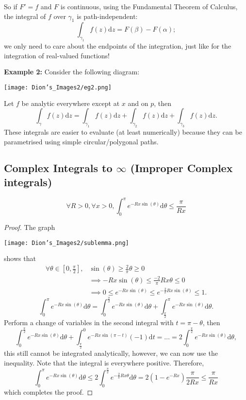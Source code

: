 So if $F' = f$ and $F$ is continuous, using the Fundamental Theorem of Calculus, the integral of $f$ over $\gamma_1$ is path-independent:
$$\int_{\gamma_1}f(z) \mathrm{d}z = F(\beta) - F(\alpha);$$
we only need to care about the endpoints of the integration, just like for the integration of real-valued functions!

\medskip\textbf{Example 2:} Consider the following diagram:

\centerline{\texttt{[image: Dion's\_Images2/eg2.png]}}

Let $f$ be analytic everywhere except at $x$ and on $p$, then
$$\int_\gamma f(z) \mathrm{d}z = \int_{\gamma_1} f(z) \mathrm{d}z + \int_{\gamma_2} f(z) \mathrm{d}z + \int_{\gamma_3} f(z) \mathrm{d}z.$$
These integrals are easier to evaluate (at least numerically) because they can be parametrised using simple circular/polygonal paths.

\subsection{Complex Integrals to $\infty$ (Improper Complex integrals)}

\begin{lem}
$$\forall R > 0, \forall x > 0, \int_0^\pi e^{-Rx\sin(\theta)} \mathrm{d}\theta \leq \frac{\pi}{Rx}$$
\end{lem}

\begin{proof}
The graph

\centerline{\texttt{[image: Dion's\_Images2/sublemma.png]}}

shows that 
\begin{align*}
\forall \theta \in \left[0, \frac{\pi}{2}\right], &\sin(\theta) \geq \frac{2}{\pi}\theta \geq 0 \\
&\implies -Rx\sin(\theta) \leq \frac{-2}{\pi}Rx\theta \leq 0 \\
&\implies 0 \leq e^{-Rx\sin(\theta)} \leq e^{-\frac{2}{\pi}Rx\sin(\theta)} \leq 1.
\end{align*}
$$\int_0^\pi e^{-Rx\sin(\theta)} \mathrm{d}\theta = \int_0^{\frac{\pi}{2}} e^{-Rx\sin(\theta)} \mathrm{d}\theta + \int_{\frac{\pi}{2}}^\pi e^{-Rx\sin(\theta)} \mathrm{d}\theta.$$
Perform a change of variables in the second integral with $t = \pi - \theta$, then
$$\int_0^{\frac{\pi}{2}} e^{-Rx\sin(\theta)} \mathrm{d}\theta + \int_{\frac{\pi}{2}}^0 e^{-Rx\sin(\pi - t)}(-1) \mathrm{d}t = \ldots = 2\int_0^{\frac{\pi}{2}} e^{-Rx\sin(\theta)} \mathrm{d}\theta,$$
this still cannot be integrated analytically, however, we can now use the inequality. Note that the integral is everywhere positive. Therefore,
$$\int_0^\pi e^{-Rx\sin(\theta)} \mathrm{d}\theta \leq 2\int_0^{\frac{\pi}{2}} e^{-\frac{2}{\pi}Rx\theta} \mathrm{d}\theta = 2(1-e^{-Rx})\frac{\pi}{2Rx} \leq \frac{\pi}{Rx}$$
which completes the proof.
\end{proof}

